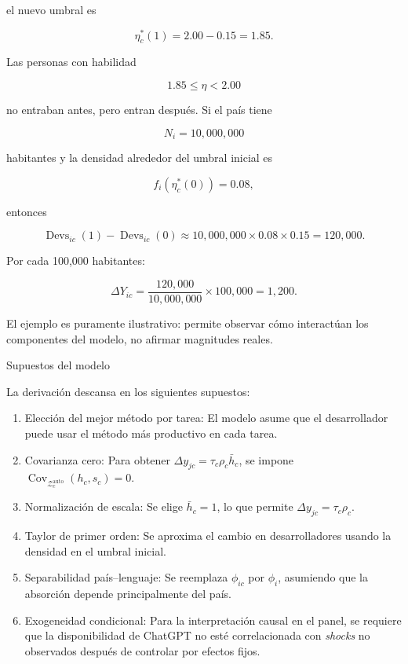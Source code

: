 \documentclass[12pt,a4paper]{article}
\let\textbf\textmd
\newcommand{\Zauto}{\mathcal{Z}^{\mathrm{auto}}_c}
\newcommand{\Covauto}{\operatorname{Cov}_{\Zauto}}
\newcommand{\Devs}{\operatorname{Devs}}
\begin{document}
el nuevo umbral es

\[
\eta_c^*(1)=2.00-0.15=1.85.
\]

Las personas con habilidad

\[
1.85\leq \eta<2.00
\]

no entraban antes, pero entran después. Si el país tiene

\[
N_i=10{,}000{,}000
\]

habitantes y la densidad alrededor del umbral inicial es

\[
f_i(\eta_c^*(0))=0.08,
\]

entonces

\[
\Devs_{ic}(1)-\Devs_{ic}(0)
\approx
10{,}000{,}000\times 0.08\times 0.15
=120{,}000.
\]

Por cada 100,000 habitantes:

\[
\Delta Y_{ic}
=
\frac{120{,}000}{10{,}000{,}000}\times 100{,}000
=1{,}200.
\]

El ejemplo es puramente ilustrativo: permite observar cómo interactúan los componentes del modelo, no afirmar magnitudes reales.

\bigskip
\noindent\textbf{Supuestos del modelo}

\medskip
\noindent La derivación descansa en los siguientes supuestos:

\begin{enumerate}
  \item \textbf{Elección del mejor método por tarea:} El modelo asume que el desarrollador puede usar el método más productivo en cada tarea.
  \item \textbf{Covarianza cero:} Para obtener $\Delta y_{jc}=\tau_c\rho_c\bar h_c$, se impone $\Covauto(h_c,s_c)=0$.
  \item \textbf{Normalización de escala:} Se elige $\bar h_c=1$, lo que permite $\Delta y_{jc}=\tau_c\rho_c$.
  \item \textbf{Taylor de primer orden:} Se aproxima el cambio en desarrolladores usando la densidad en el umbral inicial.
  \item \textbf{Separabilidad país--lenguaje:} Se reemplaza $\phi_{ic}$ por $\phi_i$, asumiendo que la absorción depende principalmente del país.
  \item \textbf{Exogeneidad condicional:} Para la interpretación causal en el panel, se requiere que la disponibilidad de ChatGPT no esté correlacionada con \textit{shocks} no observados después de controlar por efectos fijos.
\end{enumerate}
\end{document}
